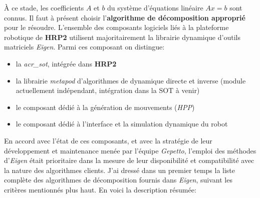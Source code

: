 \documentclass{report}
\begin{document}
\`{A} ce stade, les coefficients $A$ et $b$ du système d'équations linéaire $Ax=b$ sont connus. Il faut à présent choisir l'\textbf{algorithme de décomposition approprié} pour le résoudre. L'ensemble des composants logiciels liés à la plateforme robotique de \textbf{HRP2} utilisent majoritairement la librairie dynamique d'outils matriciels \emph{Eigen}. Parmi ces composant on distingue:
\begin{itemize}
\item la \emph{\gls{acr_sot}}, intégrée dans \textbf{HRP2}
\item la librairie \emph{metapod} d'algorithmes de dynamique directe et inverse (module actuellement indépendant, intégration dans la SOT à venir)
\item le composant dédié à la génération de mouvements (\emph{HPP})
\item le composant dédié à l'interface et la simulation dynamique du robot
\end{itemize}

En accord avec l'état de ces composants, et avec la stratégie de leur développement et maintenance menée par l'équipe \emph{Gepetto}, l'emploi des méthodes d'\emph{Eigen} était prioritaire dans la mesure de leur disponibilité et compatibilité avec la nature des algorithmes clients. J'ai dressé dans un premier temps la liste complète des algorithmes de décomposition fournis dans \emph{Eigen}, suivant les critères mentionnés plus haut. En voici la description résumée:
\end{document}
